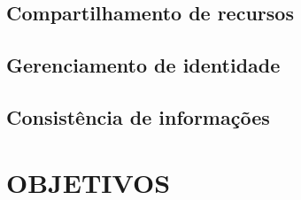 
\subsection{Compartilhamento de recursos}

\subsection{Gerenciamento de identidade}

\subsection{Consistência de informações}



\section{OBJETIVOS}
